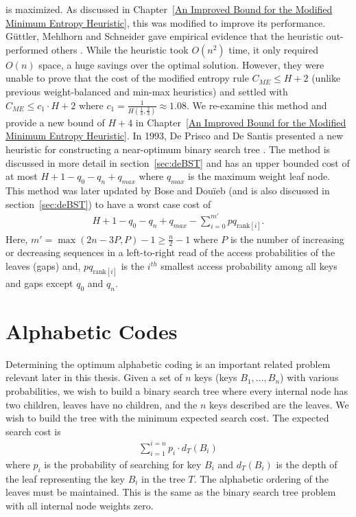 \documentclass[letterpaper,12pt,titlepage,oneside,final]{book}
\theoremstyle{plain}
\begin{document}
\noindent is maximized. As discussed in Chapter~\ref{An Improved Bound for the Modified Minimum Entropy Heuristic}, this was modified to improve its performance. G{\"u}ttler, Mehlhorn and Schneider gave empirical evidence that the heuristic out-performed others \cite{guttler1980binary}. While the heuristic took $O(n^2)$ time, it only required $O(n)$ space, a huge savings over the optimal solution. However, they were unable to prove that the cost of the modified entropy rule $C_{ME} \leq H+2$ (unlike previous weight-balanced and min-max heuristics) and settled with $C_{ME} \leq c_1\cdot H+2$ where $c_1=\frac{1}{H(\frac{1}{3}, \frac{2}{3})} \approx 1.08$. We re-examine this method and provide a new bound of $H+4$ in Chapter~\ref{An Improved Bound for the Modified Minimum Entropy Heuristic}. In 1993, De Prisco and De Santis presented a new heuristic for constructing a near-optimum binary search tree \cite{de1993binary}. The method is discussed in more detail in section~\ref{sec:deBST} and has an upper bounded cost of at most $H+1-q_0-q_n+q_{max}$ where $q_{max}$ is the maximum weight leaf node. This method was later updated by Bose and Dou\"{i}eb (and is also discussed in section~\ref{sec:deBST}) to have a worst case cost of \cite{bose2009efficient}
\begin{align*}
H + 1 - q_0 - q_n + q_{max} - \sum_{i=0}^{m'} pq_{\text{rank}[i]}.
\end{align*}
Here, $m'=\max({2n-3P,P})-1 \geq \frac{n}{2} - 1$ where $P$ is the number of increasing or decreasing sequences in a left-to-right read of the access probabilities of the leaves (gaps) and,  $pq_{\text{rank}[i]}$ is the $i^{th}$ smallest access probability among all keys and gaps except $q_0$ and $q_n$.

 
\section{Alphabetic Codes}

Determining the optimum alphabetic coding is an important related problem relevant later in this thesis. Given a set of $n$ keys (keys $B_1, ..., B_n$) with various probabilities, we wish to build a binary search tree where every internal node has two children, leaves have no children, and the $n$ keys described are the leaves. We wish to build the tree with the minimum expected search cost. The expected search cost is
\begin{align*}
\sum_{i=1}^{i=n} p_i \cdot d_T(B_i)
\end{align*}
where $p_i$ is the probability of searching for key $B_i$ and $d_T(B_i)$ is the depth of the leaf representing the key $B_i$ in the tree $T$. The alphabetic ordering of the leaves must be maintained. This is the same as the binary search tree problem with all internal node weights zero.
\end{document}
